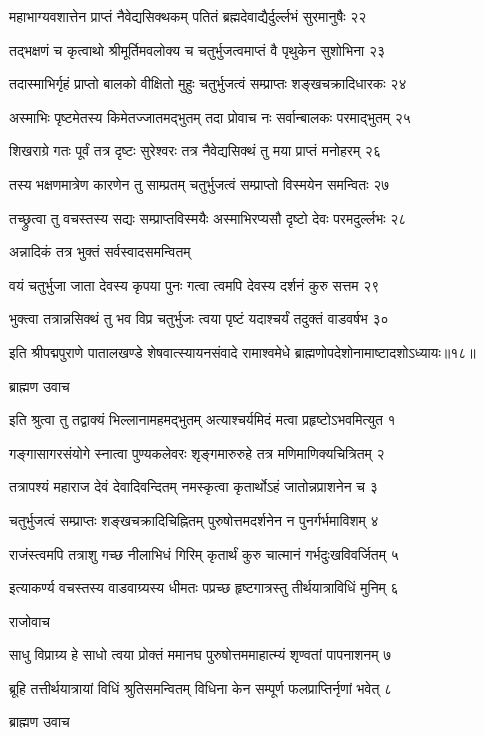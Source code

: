महाभाग्यवशात्तेन प्राप्तं नैवेद्यसिक्थकम्
पतितं ब्रह्मदेवाद्यैर्दुर्ल्लभं सुरमानुषैः २२

तद्भक्षणं च कृत्वाथो श्रीमूर्तिमवलोक्य च
चतुर्भुजत्वमाप्तं वै पृथुकेन सुशोभिना २३

तदास्माभिर्गृहं प्राप्तो बालको वीक्षितो मुहुः
चतुर्भुजत्वं सम्प्राप्तः शङ्खचक्रादिधारकः २४

अस्माभिः पृष्टमेतस्य किमेतज्जातमद्भुतम्
तदा प्रोवाच नः सर्वान्बालकः परमाद्भुतम् २५

शिखराग्रे गतः पूर्वं तत्र दृष्टः सुरेश्वरः
तत्र नैवेद्यसिक्थं तु मया प्राप्तं मनोहरम् २६

तस्य भक्षणमात्रेण कारणेन तु साम्प्रतम्
चतुर्भुजत्वं सम्प्राप्तो विस्मयेन समन्वितः २७

तच्छ्रुत्वा तु वचस्तस्य सद्यः सम्प्राप्तविस्मयैः
अस्माभिरप्यसौ दृष्टो देवः परमदुर्ल्लभः २८

अन्नादिकं तत्र भुक्तं सर्वस्वादसमन्वितम्

वयं चतुर्भुजा जाता देवस्य कृपया पुनः
गत्वा त्वमपि देवस्य दर्शनं कुरु सत्तम २९

भुक्त्वा तत्रान्नसिक्थं तु भव विप्र चतुर्भुजः
त्वया पृष्टं यदाश्चर्यं तदुक्तं वाडवर्षभ ३०

इति श्रीपद्मपुराणे पातालखण्डे शेषवात्स्यायनसंवादे रामाश्वमेधे ब्राह्मणोपदेशोनामाष्टादशोऽध्यायः॥१८॥


ब्राह्मण उवाच

इति श्रुत्वा तु तद्वाक्यं भिल्लानामहमद्भुतम्
अत्याश्चर्यमिदं मत्वा प्रहृष्टोऽभवमित्युत १

गङ्गासागरसंयोगे स्नात्वा पुण्यकलेवरः
शृङ्गमारुरुहे तत्र मणिमाणिक्यचित्रितम् २

तत्रापश्यं महाराज देवं देवादिवन्दितम्
नमस्कृत्वा कृतार्थोऽहं जातोन्नप्राशनेन च ३

चतुर्भुजत्वं सम्प्राप्तः शङ्खचक्रादिचिह्नितम्
पुरुषोत्तमदर्शनेन न पुनर्गर्भमाविशम् ४

राजंस्त्वमपि तत्राशु गच्छ नीलाभिधं गिरिम्
कृतार्थं कुरु चात्मानं गर्भदुःखविवर्जितम् ५

इत्याकर्ण्य वचस्तस्य वाडवाग्र्यस्य धीमतः
पप्रच्छ हृष्टगात्रस्तु तीर्थयात्राविधिं मुनिम् ६

राजोवाच

साधु विप्राग्र्य हे साधो त्वया प्रोक्तं ममानघ
पुरुषोत्तममाहात्म्यं शृण्वतां पापनाशनम् ७

ब्रूहि तत्तीर्थयात्रायां विधिं श्रुतिसमन्वितम्
विधिना केन सम्पूर्ण फलप्राप्तिर्नृणां भवेत् ८

ब्राह्मण उवाच

